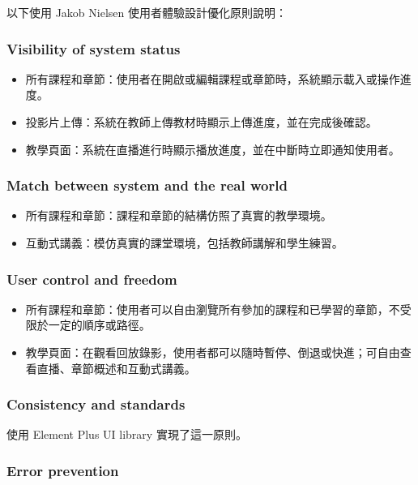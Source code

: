 \documentclass[12pt]{article}
\begin{document}
以下使用 Jakob Nielsen 使用者體驗設計優化原則說明：

\subsubsection{Visibility of system status}

\begin{itemize}
  \item 所有課程和章節：使用者在開啟或編輯課程或章節時，系統顯示載入或操作進度。
  \item 投影片上傳：系統在教師上傳教材時顯示上傳進度，並在完成後確認。
  \item 教學頁面：系統在直播進行時顯示播放進度，並在中斷時立即通知使用者。
\end{itemize}

\subsubsection{Match between system and the real world}

\begin{itemize}
  \item 所有課程和章節：課程和章節的結構仿照了真實的教學環境。
  \item 互動式講義：模仿真實的課堂環境，包括教師講解和學生練習。
\end{itemize}

\subsubsection{User control and freedom}

\begin{itemize}
  \item 所有課程和章節：使用者可以自由瀏覽所有參加的課程和已學習的章節，不受限於一定的順序或路徑。
  \item 教學頁面：在觀看回放錄影，使用者都可以隨時暫停、倒退或快進；可自由查看直播、章節概述和互動式講義。
\end{itemize}

\subsubsection{Consistency and standards}

使用 Element Plus UI library 實現了這一原則。

\subsubsection{Error prevention}
\end{document}
